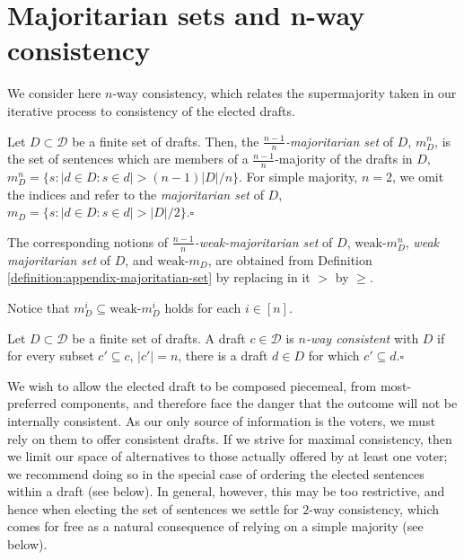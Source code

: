 \documentclass{llncs}
\newcommand{\qqed}{\hfill$\square$}
\newcommand{\calD}{\mathcal{D}}
\begin{document}




\appendix


\section{Majoritarian sets and n-way consistency}


We consider here $n$-way consistency, which relates the supermajority taken in our iterative process to consistency of the elected drafts.

\begin{definition}\label{definition:appendix-majoritatian-set}
Let $D \subset \calD$ be a finite set of drafts. Then, the \emph{$\frac{n-1}{n}$-majoritarian set} of $D$, $m^n_D$, is  the set of sentences which are members of a $\frac{n-1}{n}$-majority of the drafts in $D$, $m^n_D = \{s: |d \in D : s \in d| > (n-1)|D|/n\}$.
%
For simple majority, $n=2$, we omit the indices and refer to the \emph{majoritarian set} of $D$, $m_D = \{s: |d \in D : s \in d| > |D|/2\}$.\qqed
%
\end{definition}

The corresponding notions of \emph{$\frac{n-1}{n}$-weak-majoritarian set} of $D$, $\textrm{weak-}m^n_D$, \emph{weak majoritarian set} of $D$, and $\textrm{weak-}m_D$, are obtained from Definition \ref{definition:appendix-majoritatian-set} by replacing  in it $>$ by $\ge$.

Notice that $m^i_D \subseteq \textrm{weak-}m^i_D$ holds for each $i \in [n]$.

\begin{definition}
Let $D \subset \calD$ be a finite set of drafts. A draft $c \in \calD$ is \emph{$n$-way consistent} with $D$ if for every subset $c' \subseteq c$, $|c'|=n$, there is a draft $d \in D$ for which $c' \subseteq d$.\qqed
\end{definition}

We wish to allow the elected draft to be composed piecemeal, from most-preferred components, and therefore face the danger that the outcome will not be internally consistent. As our only source of information is the voters, we must rely on them to offer consistent drafts.  If we strive for maximal consistency, then we limit our space of alternatives to those actually offered by at least one voter; we recommend doing so in the special case of ordering the elected sentences within a draft (see below).  In general, however, this may be too restrictive, and hence when electing the set of sentences we settle for $2$-way consistency, which comes for free as a natural consequence of relying on a simple majority (see below).
\end{document}
